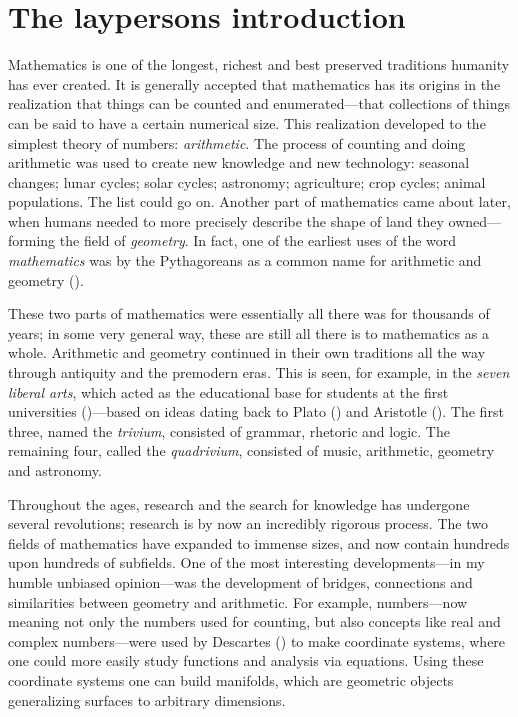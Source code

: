 
\section{The laypersons introduction}
\label{ch0:layperson}

Mathematics is one of the longest, richest and best preserved traditions humanity has ever created. It is generally accepted that mathematics has its origins in the realization that things can be counted and enumerated---that collections of things can be said to have a certain numerical size. This realization developed to the simplest theory of numbers: \emph{arithmetic}. The process of counting and doing arithmetic was used to create new knowledge and new technology: seasonal changes; lunar cycles; solar cycles; astronomy; agriculture; crop cycles; animal populations. The list could go on. Another part of mathematics came about later, when humans needed to more precisely describe the shape of land they owned---forming the field of \emph{geometry}. In fact, one of the earliest uses of the word \emph{mathematics} was by the Pythagoreans as a common name for arithmetic and geometry (\cite[1.1]{history}).

These two parts of mathematics were essentially all there was for thousands of years; in some very general way, these are still all there is to mathematics as a whole. Arithmetic and geometry continued in their own traditions all the way through antiquity and the premodern eras. This is seen, for example, in the \emph{seven liberal arts}, which acted as the educational base for students at the first universities (\cite{universities})---based on ideas dating back to Plato (\cite{plato}) and Aristotle (\cite{aristotle}). The first three, named the \emph{trivium}, consisted of grammar, rhetoric and logic. The remaining four, called the \emph{quadrivium}, consisted of music, arithmetic, geometry and astronomy.

Throughout the ages, research and the search for knowledge has undergone several revolutions; research is by now an incredibly rigorous process. The two fields of mathematics have expanded to immense sizes, and now contain hundreds upon hundreds of subfields. One of the most interesting developments---in my humble unbiased opinion---was the development of bridges, connections and similarities between geometry and arithmetic. For example, numbers---now meaning not only the numbers used for counting, but also concepts like real and complex numbers---were used by Descartes (\cite{descartes}) to make coordinate systems, where one could more easily study functions and analysis via equations. Using these coordinate systems one can build manifolds, which are geometric objects generalizing surfaces to arbitrary dimensions. 

